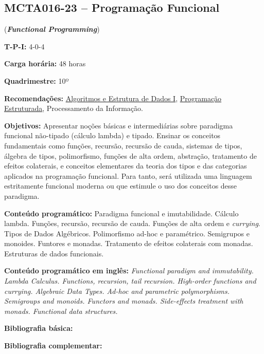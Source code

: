 \documentclass[class=article, crop=false]{standalone}
\begin{document}
\subsection{MCTA016-23 -- Programação Funcional}
\label{disc:pf}

(\textbf{\textit{Functional Programming}})

\begin{center}
    \begin{minipage}{0.85\textwidth}
        \textbf{T-P-I:} 4-0-4
        
        \textbf{Carga horária:} 48 horas
        
        \textbf{Quadrimestre:} 10º
        
        \textbf{Recomendações:} 
        \hyperref[disc:aedI]{Algoritmos e Estrutura de Dados I},
        \hyperref[disc:pe]{Programação Estruturada},
        Processamento da Informação.
    \end{minipage}
\end{center}

\textbf{Objetivos:}
Apresentar noções básicas e intermediárias sobre paradigma funcional não-tipado
(cálculo lambda) e tipado. Ensinar os conceitos fundamentais como funções,
recursão, recursão de cauda, sistemas de tipos, álgebra de tipos, polimorfismo,
funções de alta ordem, abstração, tratamento de efeitos colaterais, e conceitos
elementares da teoria dos tipos e das categorias aplicados na programação
funcional. Para tanto, será utilizada uma linguagem estritamente funcional
moderna ou que estimule o uso dos conceitos desse paradigma.

\textbf{Conteúdo programático:}
Paradigma funcional e imutabilidade.
Cálculo lambda.
Funções, recursão, recursão de cauda.
Funções de alta ordem e \textit{currying}.
Tipos de Dados Algébricos.
Polimorfismo ad-hoc e paramétrico.
Semigrupos e monoides.
Funtores e monadas.
Tratamento de efeitos colaterais com monadas.
Estruturas de dados funcionais.

\textbf{Conteúdo programático em inglês:}
\textit{Functional paradigm and immutability.
Lambda Calculus.
Functions, recursion, tail recursion.
High-order functions and currying.
Algebraic Data Types.
Ad-hoc and parametric polymorphisms.
Semigroups and monoids.
Functors and monads.
Side-effects treatment with monads.
Functional data structures.}

\newrefsection
\textbf{Bibliografia básica:}
\nocite{1994-wadler-etal,1998-okasaki,2016-hutton}
\printbibliography

\newrefsection
\textbf{Bibliografia complementar:}
\nocite{2020-wadler,2009-dybvig,2009-sullivan-etal,2021-hickey-etal,2009-cesarini-etal}
\printbibliography
\end{document}
